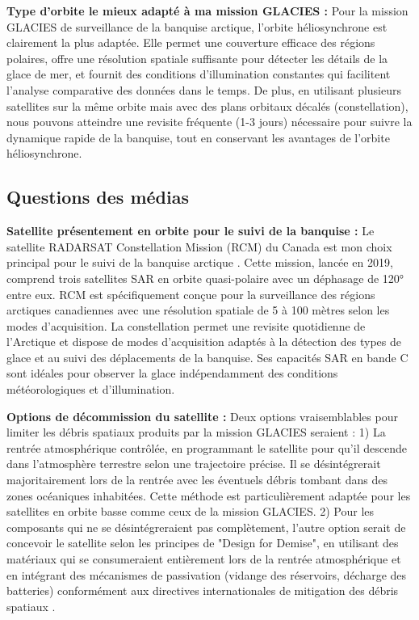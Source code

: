 \documentclass[12pt,a4paper]{article}
\begin{document}
\textbf{Type d'orbite le mieux adapté à ma mission GLACIES :} Pour la mission GLACIES de surveillance de la banquise arctique, l'orbite héliosynchrone est clairement la plus adaptée. Elle permet une couverture efficace des régions polaires, offre une résolution spatiale suffisante pour détecter les détails de la glace de mer, et fournit des conditions d'illumination constantes qui facilitent l'analyse comparative des données dans le temps. De plus, en utilisant plusieurs satellites sur la même orbite mais avec des plans orbitaux décalés (constellation), nous pouvons atteindre une revisite fréquente (1-3 jours) nécessaire pour suivre la dynamique rapide de la banquise, tout en conservant les avantages de l'orbite héliosynchrone.

\subsection{Questions des médias}

\textbf{Satellite présentement en orbite pour le suivi de la banquise :} Le satellite RADARSAT Constellation Mission (RCM) du Canada est mon choix principal pour le suivi de la banquise arctique \citep{CSA2019, Zakhvatkina2022}. Cette mission, lancée en 2019, comprend trois satellites SAR en orbite quasi-polaire avec un déphasage de 120° entre eux. RCM est spécifiquement conçue pour la surveillance des régions arctiques canadiennes avec une résolution spatiale de 5 à 100 mètres selon les modes d'acquisition. La constellation permet une revisite quotidienne de l'Arctique et dispose de modes d'acquisition adaptés à la détection des types de glace et au suivi des déplacements de la banquise. Ses capacités SAR en bande C sont idéales pour observer la glace indépendamment des conditions météorologiques et d'illumination.

\textbf{Options de décommission du satellite :} Deux options vraisemblables pour limiter les débris spatiaux produits par la mission GLACIES seraient : 1) La rentrée atmosphérique contrôlée, en programmant le satellite pour qu'il descende dans l'atmosphère terrestre selon une trajectoire précise. Il se désintégrerait majoritairement lors de la rentrée avec les éventuels débris tombant dans des zones océaniques inhabitées. Cette méthode est particulièrement adaptée pour les satellites en orbite basse comme ceux de la mission GLACIES. 2) Pour les composants qui ne se désintégreraient pas complètement, l'autre option serait de concevoir le satellite selon les principes de "Design for Demise", en utilisant des matériaux qui se consumeraient entièrement lors de la rentrée atmosphérique \citep{NASA2023, IADC2020} et en intégrant des mécanismes de passivation (vidange des réservoirs, décharge des batteries) conformément aux directives internationales de mitigation des débris spatiaux \citep{Dutta2022}.
\end{document}
